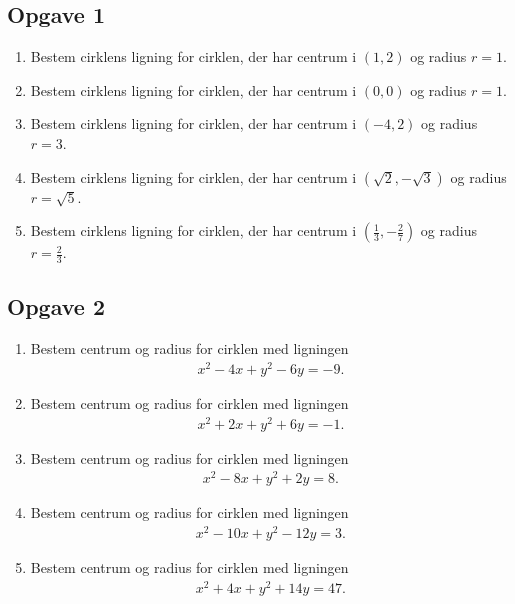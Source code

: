 \subsection*{Opgave 1}

\begin{enumerate}[label=\roman*)]
	\item Bestem cirklens ligning for cirklen, der har centrum i $(1,2)$
	 og radius $r = 1$.
	\item Bestem cirklens ligning for cirklen, der har centrum i $(0,0)$
	og radius $r = 1$.
	\item Bestem cirklens ligning for cirklen, der har centrum i $(-4,2)$
	og radius $r = 3$.
	\item Bestem cirklens ligning for cirklen, der har centrum i $(\sqrt{2},-\sqrt{3})$
	og radius $r = \sqrt{5}$.
	\item Bestem cirklens ligning for cirklen, der har centrum i $(\frac{1}{3},-\frac{2}{7})$
	og radius $r = \frac{2}{3}$.
\end{enumerate}

\subsection*{Opgave 2}

\begin{enumerate}[label=\roman*)]
	\item Bestem centrum og radius for cirklen med ligningen
	\begin{align*}
		x^2 - 4 x + y^2 - 6 y= -9.
	\end{align*}
	\item Bestem centrum og radius for cirklen med ligningen
	\begin{align*}
		x^2 + 2 x + y^2 + 6 y = -1.
	\end{align*}
	\item Bestem centrum og radius for cirklen med ligningen
	\begin{align*}
		x^2 - 8 x + y^2 + 2 y  = 8.
	\end{align*}
	\item Bestem centrum og radius for cirklen med ligningen
	\begin{align*}
		x^2 - 10 x + y^2 - 12 y  = 3.
	\end{align*}
	\item Bestem centrum og radius for cirklen med ligningen
	\begin{align*}
		x^2 + 4 x + y^2 + 14 y = 47.
	\end{align*}
	
\end{enumerate}

